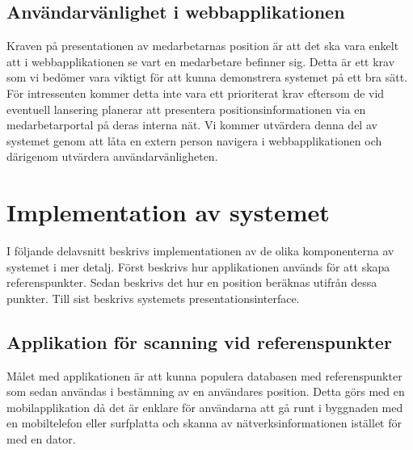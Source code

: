 \documentclass[a4paper,12pt]{article}
\begin{document}
 \subsection{Användarvänlighet i webbapplikationen}\label{krav_anv}
 Kraven på presentationen av medarbetarnas position är att det ska vara enkelt att i webbapplikationen se vart en medarbetare befinner sig. Detta är ett krav som vi bedömer vara viktigt för att kunna demonstrera systemet på ett bra sätt. För intressenten kommer detta inte vara ett prioriterat krav eftersom de vid eventuell lansering planerar att presentera positionsinformationen via en medarbetarportal på deras interna nät. Vi kommer utvärdera denna del av systemet genom att låta en extern person navigera i webbapplikationen och därigenom utvärdera användarvänligheten.

 \section{Implementation av systemet}
 I följande delavsnitt beskrivs implementationen av de olika komponenterna av systemet i mer detalj. Först beskrivs hur applikationen används för att skapa referenspunkter. Sedan beskrivs det hur en position beräknas utifrån dessa punkter. Till sist beskrivs systemets presentationsinterface.

 \subsection{Applikation för scanning vid referenspunkter}
 Målet med applikationen är att kunna populera databasen med referenspunkter som sedan användas i bestämning av en användares position. Detta görs med en mobilapplikation då det är enklare för användarna att gå runt i byggnaden med en mobiltelefon eller surfplatta och skanna av nätverksinformationen istället för med en dator.
\end{document}
